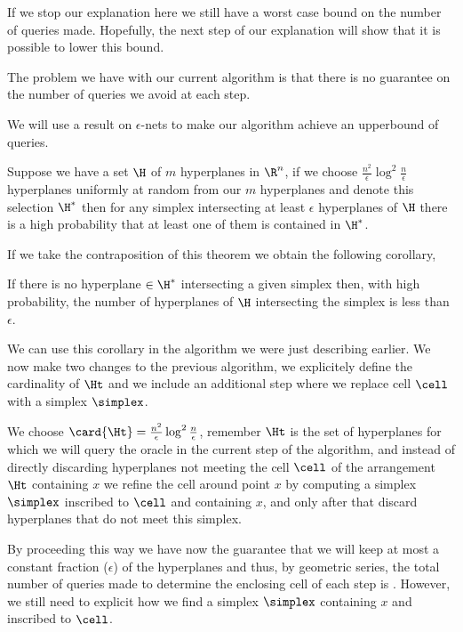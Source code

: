 If we stop our explanation here we still have a worst case 
bound on the number of queries made. Hopefully, the next step of our
explanation will show that it is possible to lower this bound.

The problem we have with our current algorithm is that there is no guarantee
on the number of queries we avoid at each step.

We will use a result on $\epsilon$-nets to make our algorithm achieve an
upperbound of  queries.

\begin{theorem}
Suppose we have a set $\H$ of $m$ hyperplanes in $\R^n$, if we choose
$\frac{n^2}{\epsilon} \log^2 \frac{n}{\epsilon}$ hyperplanes uniformly at
random from our $m$ hyperplanes and denote this selection $\H^{*}$ then for
any simplex intersecting at least $\epsilon$ hyperplanes of $\H$ there is a
high probability that at least one of them is contained in $\H^{*}$.
\end{theorem}

If we take the contraposition of this theorem we obtain the following
corollary,

\begin{corollary}
If there is no hyperplane $\in \H^{*}$ intersecting a given simplex then, with
high probability, the number of hyperplanes of $\H$ intersecting the simplex
is less than $\epsilon$.
\end{corollary}

We can use this corollary in the algorithm we were just describing earlier. We
now make two changes to the previous algorithm, we explicitely define the
cardinality of $\Ht$ and we include an additional step where we replace cell
$\cell$ with a simplex $\simplex$.

We choose $\card{\Ht} = \frac{n^2}{\epsilon} \log^2 \frac{n}{\epsilon}$,
remember $\Ht$ is the set of hyperplanes for which we will query the oracle in
the current step of the algorithm, and instead of directly discarding
hyperplanes not meeting the cell $\cell$ of the arrangement $\Ht$ containing $x$ we
refine the cell around point $x$ by computing a simplex $\simplex$ inscribed
to $\cell$ and containing $x$, and only after that discard hyperplanes that do
not meet this simplex.

By proceeding this way we have now the guarantee that we will keep at most a
constant fraction ($\epsilon$) of the hyperplanes and thus, by geometric
series, the total number of queries made to determine the enclosing cell of
each step is . However, we
still need to explicit how we find a simplex $\simplex$ containing $x$ and
inscribed to $\cell$.

